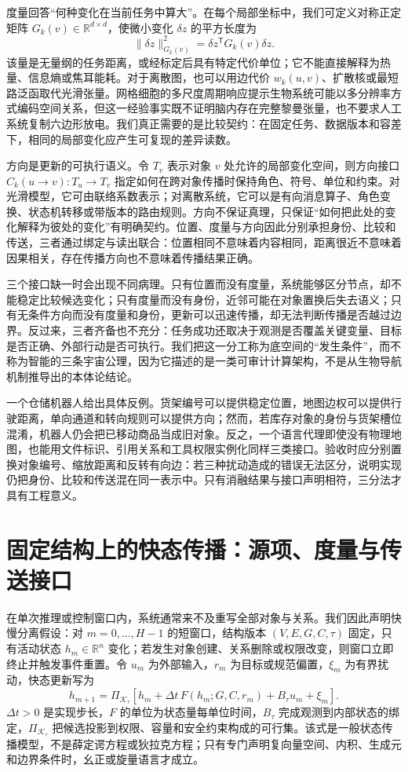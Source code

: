 度量回答“何种变化在当前任务中算大”。在每个局部坐标中，我们可定义对称正定矩阵 $G_k(v)\in\mathbb{R}^{d\times d}$，使微小变化 $\delta z$ 的平方长度为
\[
\|\delta z\|^2_{G_k(v)}=\delta z^{\mathsf T}G_k(v)\delta z.
\]
该量是无量纲的任务距离，或经标定后具有特定代价单位；它不能直接解释为热量、信息熵或焦耳能耗。对于离散图，也可以用边代价 $w_k(u,v)$、扩散核或最短路泛函取代光滑张量。网格细胞的多尺度周期响应提示生物系统可能以多分辨率方式编码空间关系，但这一经验事实既不证明脑内存在完整黎曼张量，也不要求人工系统复制六边形放电。我们真正需要的是比较契约：在固定任务、数据版本和容差下，相同的局部变化应产生可复现的差异读数。

方向是更新的可执行语义。令 $T_v$ 表示对象 $v$ 处允许的局部变化空间，则方向接口 $C_k(u\!\rightarrow\!v):T_u\rightarrow T_v$ 指定如何在跨对象传播时保持角色、符号、单位和约束。对光滑模型，它可由联络系数表示；对离散系统，它可以是有向消息算子、角色变换、状态机转移或带版本的路由规则。方向不保证真理，只保证“如何把此处的变化解释为彼处的变化”有明确契约。位置、度量与方向因此分别承担身份、比较和传送，三者通过绑定与读出联合：位置相同不意味着内容相同，距离很近不意味着因果相关，存在传播方向也不意味着传播结果正确。

三个接口缺一时会出现不同病理。只有位置而没有度量，系统能够区分节点，却不能稳定比较候选变化；只有度量而没有身份，近邻可能在对象置换后失去语义；只有无条件方向而没有度量和身份，更新可以迅速传播，却无法判断传播是否越过边界。反过来，三者齐备也不充分：任务成功还取决于观测是否覆盖关键变量、目标是否正确、外部行动是否可执行。我们把这一分工称为底空间的“发生条件”，而不称为智能的三条宇宙公理，因为它描述的是一类可审计计算架构，不是从生物导航机制推导出的本体论结论。

一个仓储机器人给出具体反例。货架编号可以提供稳定位置，地图边权可以提供行驶距离，单向通道和转向规则可以提供方向；然而，若库存对象的身份与货架槽位混淆，机器人仍会把已移动商品当成旧对象。反之，一个语言代理即使没有物理地图，也能用文件标识、引用关系和工具权限实例化同样三类接口。验收时应分别置换对象编号、缩放距离和反转有向边：若三种扰动造成的错误无法区分，说明实现仍把身份、比较和传送混在同一表示中。只有消融结果与接口声明相符，三分法才具有工程意义。

\section{固定结构上的快态传播：源项、度量与传送接口}
\label{sec:transient_constraint_tde_channeling}

在单次推理或控制窗口内，系统通常来不及重写全部对象与关系。我们因此声明快慢分离假设：对 $m=0,\ldots,H-1$ 的短窗口，结构版本 $(V,E,G,C,\tau)$ 固定，只有活动状态 $h_m\in\mathbb{R}^{n}$ 变化；若发生对象创建、关系删除或权限改变，则窗口立即终止并触发事件重置。令 $u_m$ 为外部输入，$r_m$ 为目标或规范偏置，$\xi_m$ 为有界扰动，快态更新写为
\[
h_{m+1}=\Pi_{\mathcal{K}_\tau}\!\left[h_m+\Delta t\,F(h_m;G,C,r_m)+B_\tau u_m+\xi_m\right].
\]
$\Delta t>0$ 是实现步长，$F$ 的单位为状态量每单位时间，$B_\tau$ 完成观测到内部状态的绑定，$\Pi_{\mathcal K_\tau}$ 把候选投影到权限、容量和安全约束构成的可行集。该式是一般状态传播模型，不是薛定谔方程或狄拉克方程；只有专门声明复向量空间、内积、生成元和边界条件时，幺正或旋量语言才成立。

